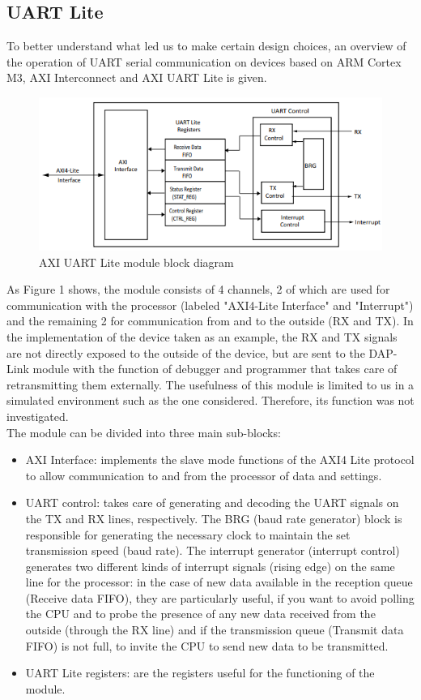 \documentclass[11pt]{article}
\begin{document}
	\subsection{UART Lite}
	To better understand what led us to make certain design choices, an overview of the operation of UART serial communication on devices based on ARM Cortex M3, AXI Interconnect and AXI UART Lite is given.
	\begin{figure}[H]
			\begin{center}
		\includegraphics[scale=0.80]{AXI_UART_Module}	
		\caption{AXI UART Lite module block diagram}
	\end{center}
\end{figure}
	As Figure 1 shows, the module consists of 4 channels, 2  of which are used for communication with the processor (labeled "AXI4-Lite Interface" and "Interrupt") and the remaining 2 for communication from and to the outside (RX and TX). In the implementation of the device taken as an example, the RX and TX signals are not directly exposed to the outside of the device, but are sent to the DAP-Link module with the function of debugger and programmer that takes care of retransmitting them externally. The usefulness of this module is limited to us in a simulated environment such as the one considered. Therefore, its function was not investigated. \\
	The module can be divided into three main sub-blocks:
	\begin{itemize}
	\item AXI Interface: implements the slave mode functions of the AXI4 Lite protocol to allow communication to and from the processor of data and settings.
	\item UART control: takes care of generating and decoding the UART signals on the TX and RX lines, respectively. The BRG (baud rate generator) block is responsible for generating the necessary clock to maintain the set transmission speed (baud rate). The interrupt generator (interrupt control) generates two different kinds of interrupt signals (rising edge) on the same line for the processor: in the case of new data available in the reception queue (Receive data FIFO), they are particularly useful, if you want to avoid polling the CPU and to probe the presence of any new data received from the outside (through the RX line) and if the transmission queue (Transmit data FIFO) is not full, to invite the CPU to send new data to be transmitted.
	\item UART Lite registers: are the registers useful for the functioning of the module.
	\end{itemize}
\end{document}
